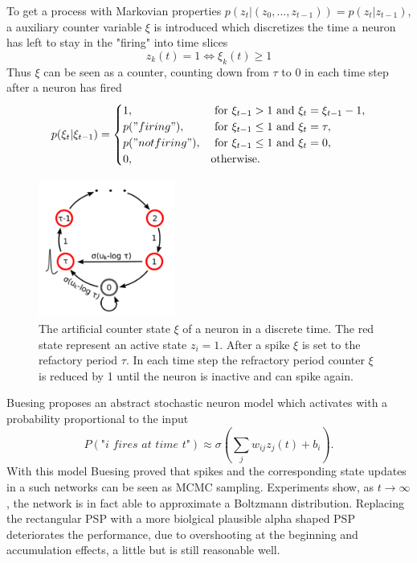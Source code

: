 To get a process with Markovian properties $p(z_t| (z_0, ..., z_{t-1})) = p(z_t| z_{t-1}) $, a auxiliary counter variable $\xi$ is introduced which discretizes the time a neuron has left to stay in the "firing" into time slices
\[
z_k(t) = 1 \iff \xi_k(t) \ge 1
\]
Thus $\xi$ can be seen as a counter, counting down from $\tau$ to $0$ in each time step after a neuron has fired
\[
p(\xi_t | \xi_{t-1}) = 
\begin{cases}
	1, & \text{ for } \xi_{t-1} > 1 \text{ and } \xi_t = \xi_{t-1} -1 ,\\
	p("firing"), & \text{ for } \xi_{t-1} \le 1 \text{ and } \xi_t = \tau ,\\
	p("not firing"), & \text{ for } \xi_{t-1} \le 1 \text{ and } \xi_t = 0 ,\\
	0, & \text{otherwise}.
\end{cases}
\]

\begin{figure}
	\centering
    	\includegraphics[width=0.4\textwidth]{imgs/snn_sample2.png} 
    \caption{The artificial counter state $\xi$ of a neuron in a discrete time. The red state represent an active state $z_i = 1$. After a spike $\xi$ is set to the refactory period $\tau$. In each time step the refractory period counter $\xi$ is reduced by 1 until the neuron is inactive and can spike again.}
	\label{fig:snnsamp2}
\end{figure}

Buesing proposes an abstract stochastic neuron model which activates with a probability proportional to the input
\[
P(\textit{"i fires at time t"}) \approx \sigma(\sum_j w_{ij} z_j(t) + b_i).
\]
With this model Buesing proved that spikes and the corresponding state updates in a such networks can be seen as MCMC sampling. Experiments show, as $t \rightarrow \infty$ , the network is in fact able to approximate a Boltzmann distribution.
Replacing the rectangular PSP with a more biolgical plausible alpha shaped PSP deteriorates the performance, due to overshooting at the beginning and accumulation effects, a little but is still reasonable well.

